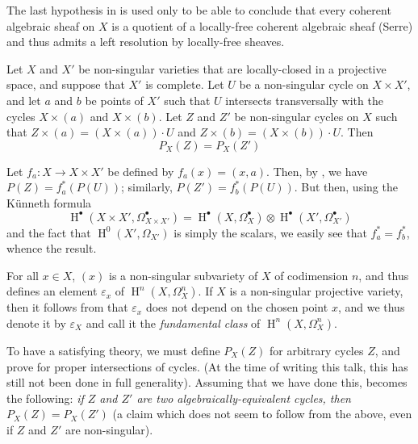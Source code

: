 The last hypothesis in  is used only to be able to conclude that every coherent algebraic sheaf on $X$ is a quotient of a locally-free coherent algebraic sheaf (Serre) and thus admits a left resolution by locally-free sheaves.


\begin{corollary}\label{fga1-theorem-1-corollary-1}
  Let $X$ and $X'$ be non-singular varieties that are locally-closed in a projective space, and suppose that $X'$ is complete.
  Let $U$ be a non-singular cycle on $X\times X'$, and let $a$ and $b$ be points of $X'$ such that $U$ intersects transversally with the cycles $X\times(a)$ and $X\times(b)$.
  Let $Z$ and $Z'$ be non-singular cycles on $X$ such that $Z\times(a)=(X\times(a))\cdot U$ and $Z\times(b)=(X\times(b))\cdot U$.
  Then
  \[P_X(Z) = P_X(Z')\]
\end{corollary}

\begin{cproof}
  Let $f_a\colon X\to X\times X'$ be defined by $f_a(x)=(x,a)$.
  Then, by , we have $P(Z)=f_a^*(P(U))$;
  similarly, $P(Z')=f_b^*(P(U))$.
  But then, using the Künneth formula
  \[
    \operatorname{H}^\bullet(X\times X',\Omega_{X\times X'}^\bullet)
    = \operatorname{H}^\bullet(X,\Omega_X^\bullet)\otimes\operatorname{H}^\bullet(X',\Omega_{X'}^\bullet)
  \]
  and the fact that $\operatorname{H}^0(X',\Omega_{X'})$ is simply the scalars, we easily see that $f_a^*=f_b^*$, whence the result.
\end{cproof}

For all $x\in X$, $(x)$ is a non-singular subvariety of $X$ of codimension $n$, and thus defines an element $\varepsilon_x$ of $\operatorname{H}^n(X,\Omega_X^n)$.
If $X$ is a non-singular projective variety, then it follows from  that $\varepsilon_x$ does not depend on the chosen point $x$, and we thus denote it by $\varepsilon_X$ and call it the \emph{fundamental class} of $\operatorname{H}^n(X,\Omega_X^n)$.

\begin{remark}\label{fga1-4-remark-i}
  To have a satisfying theory, we must define $P_X(Z)$ for arbitrary cycles $Z$, and prove  for proper intersections of cycles.
  (At the time of writing this talk, this has still not been done in full generality).
  Assuming that we have done this,  becomes the following:
  \emph{if $Z$ and $Z'$ are two algebraically-equivalent cycles, then $P_X(Z)=P_X(Z')$}
  (a claim which does not seem to follow from the above, even if $Z$ and $Z'$ are non-singular).
\end{remark}


